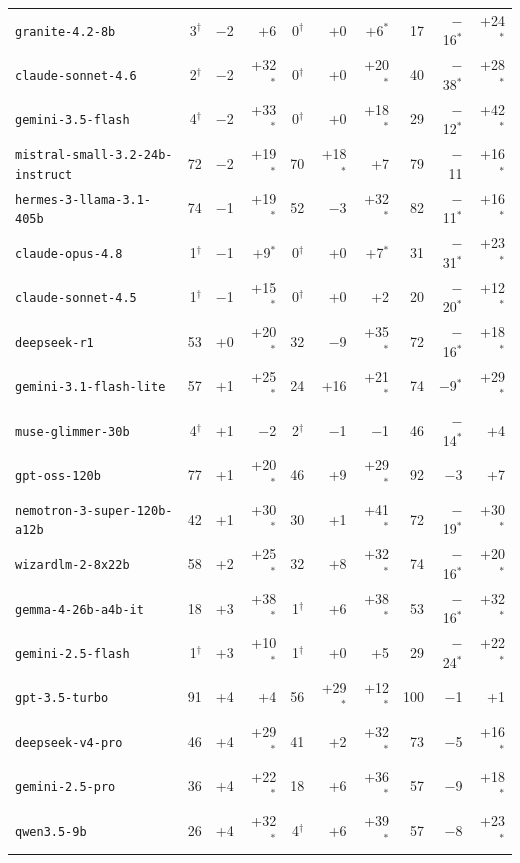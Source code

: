 \begin{tabular}{l rrr rrr rrr}
\texttt{granite-4.2-8b} & 3$^\dagger$ & $-$2 & +6 & 0$^\dagger$ & +0 & +6$^*$ & 17 & $-$16$^*$ & +24$^*$ \\
\texttt{claude-sonnet-4.6} & 2$^\dagger$ & $-$2 & +32$^*$ & 0$^\dagger$ & +0 & +20$^*$ & 40 & $-$38$^*$ & +28$^*$ \\
\texttt{gemini-3.5-flash} & 4$^\dagger$ & $-$2 & +33$^*$ & 0$^\dagger$ & +0 & +18$^*$ & 29 & $-$12$^*$ & +42$^*$ \\
\texttt{mistral-small-3.2-24b-instruct} & 72 & $-$2 & +19$^*$ & 70 & +18$^*$ & +7 & 79 & $-$11 & +16$^*$ \\
\texttt{hermes-3-llama-3.1-405b} & 74 & $-$1 & +19$^*$ & 52 & $-$3 & +32$^*$ & 82 & $-$11$^*$ & +16$^*$ \\
\texttt{claude-opus-4.8} & 1$^\dagger$ & $-$1 & +9$^*$ & 0$^\dagger$ & +0 & +7$^*$ & 31 & $-$31$^*$ & +23$^*$ \\
\texttt{claude-sonnet-4.5} & 1$^\dagger$ & $-$1 & +15$^*$ & 0$^\dagger$ & +0 & +2 & 20 & $-$20$^*$ & +12$^*$ \\
\texttt{deepseek-r1} & 53 & +0 & +20$^*$ & 32 & $-$9 & +35$^*$ & 72 & $-$16$^*$ & +18$^*$ \\
\texttt{gemini-3.1-flash-lite} & 57 & +1 & +25$^*$ & 24 & +16 & +21$^*$ & 74 & $-$9$^*$ & +29$^*$ \\
\texttt{muse-glimmer-30b} & 4$^\dagger$ & +1 & $-$2 & 2$^\dagger$ & $-$1 & $-$1 & 46 & $-$14$^*$ & +4 \\
\texttt{gpt-oss-120b} & 77 & +1 & +20$^*$ & 46 & +9 & +29$^*$ & 92 & $-$3 & +7 \\
\texttt{nemotron-3-super-120b-a12b} & 42 & +1 & +30$^*$ & 30 & +1 & +41$^*$ & 72 & $-$19$^*$ & +30$^*$ \\
\texttt{wizardlm-2-8x22b} & 58 & +2 & +25$^*$ & 32 & +8 & +32$^*$ & 74 & $-$16$^*$ & +20$^*$ \\
\texttt{gemma-4-26b-a4b-it} & 18 & +3 & +38$^*$ & 1$^\dagger$ & +6 & +38$^*$ & 53 & $-$16$^*$ & +32$^*$ \\
\texttt{gemini-2.5-flash} & 1$^\dagger$ & +3 & +10$^*$ & 1$^\dagger$ & +0 & +5 & 29 & $-$24$^*$ & +22$^*$ \\
\texttt{gpt-3.5-turbo} & 91 & +4 & +4 & 56 & +29$^*$ & +12$^*$ & 100 & $-$1 & +1 \\
\texttt{deepseek-v4-pro} & 46 & +4 & +29$^*$ & 41 & +2 & +32$^*$ & 73 & $-$5 & +16$^*$ \\
\texttt{gemini-2.5-pro} & 36 & +4 & +22$^*$ & 18 & +6 & +36$^*$ & 57 & $-$9 & +18$^*$ \\
\texttt{qwen3.5-9b} & 26 & +4 & +32$^*$ & 4$^\dagger$ & +6 & +39$^*$ & 57 & $-$8 & +23$^*$ \\

\end{tabular}
